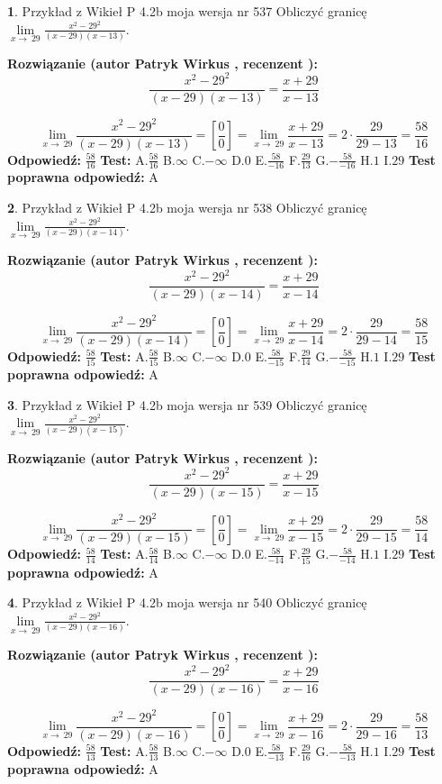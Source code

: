 \documentclass[12pt, a4paper]{article}
\theoremstyle{definition} %
\newtheorem{zad}{}
\newcommand{\zadStart}[1]{\begin{zad}#1\newline}
\newcommand{\zadStop}{\end{zad}}
\newcommand{\rozwStart}[2]{\noindent \textbf{Rozwiązanie (autor #1 , recenzent #2): }\newline}
\newcommand{\rozwStop}{\newline}
\newcommand{\odpStart}{\noindent \textbf{Odpowiedź:}\newline}
\newcommand{\odpStop}{\newline}
\newcommand{\testStart}{\noindent \textbf{Test:}\newline}
\newcommand{\testStop}{\newline}
\newcommand{\kluczStart}{\noindent \textbf{Test poprawna odpowiedź:}\newline}
\newcommand{\kluczStop}{\newline}
\begin{document}
\zadStart{Przykład z Wikieł P 4.2b moja wersja nr 537}
Obliczyć granicę $\lim\limits_{x\to\ 29}\frac{x^{2}-29^{2}}{(x-29)(x-13)}$.
\zadStop
\rozwStart{Patryk Wirkus}{}
$$\frac{x^{2}-29^{2}}{(x-29)(x-13)}=\frac{x+29}{x-13}$$

$$\lim\limits_{x\to\ 29}\frac{x^{2}-29^{2}}{(x-29)(x-13)}=[\frac{0}{0}]=\lim\limits_{x\to\ 29}\frac{x+29}{x-13}=2 \cdot \frac{29}{29-13} = \frac{58}{16}$$
\rozwStop
\odpStart
$\frac{58}{16}$
\odpStop
\testStart
A.$\frac{58}{16}$
B.$\infty$
C.$-\infty$
D.$0$
E.$\frac{58}{-16}$
F.$\frac{29}{13}$
G.$-\frac{58}{-16}$
H.$1$
I.$29$
\testStop
\kluczStart
A
\kluczStop



\zadStart{Przykład z Wikieł P 4.2b moja wersja nr 538}
Obliczyć granicę $\lim\limits_{x\to\ 29}\frac{x^{2}-29^{2}}{(x-29)(x-14)}$.
\zadStop
\rozwStart{Patryk Wirkus}{}
$$\frac{x^{2}-29^{2}}{(x-29)(x-14)}=\frac{x+29}{x-14}$$

$$\lim\limits_{x\to\ 29}\frac{x^{2}-29^{2}}{(x-29)(x-14)}=[\frac{0}{0}]=\lim\limits_{x\to\ 29}\frac{x+29}{x-14}=2 \cdot \frac{29}{29-14} = \frac{58}{15}$$
\rozwStop
\odpStart
$\frac{58}{15}$
\odpStop
\testStart
A.$\frac{58}{15}$
B.$\infty$
C.$-\infty$
D.$0$
E.$\frac{58}{-15}$
F.$\frac{29}{14}$
G.$-\frac{58}{-15}$
H.$1$
I.$29$
\testStop
\kluczStart
A
\kluczStop



\zadStart{Przykład z Wikieł P 4.2b moja wersja nr 539}
Obliczyć granicę $\lim\limits_{x\to\ 29}\frac{x^{2}-29^{2}}{(x-29)(x-15)}$.
\zadStop
\rozwStart{Patryk Wirkus}{}
$$\frac{x^{2}-29^{2}}{(x-29)(x-15)}=\frac{x+29}{x-15}$$

$$\lim\limits_{x\to\ 29}\frac{x^{2}-29^{2}}{(x-29)(x-15)}=[\frac{0}{0}]=\lim\limits_{x\to\ 29}\frac{x+29}{x-15}=2 \cdot \frac{29}{29-15} = \frac{58}{14}$$
\rozwStop
\odpStart
$\frac{58}{14}$
\odpStop
\testStart
A.$\frac{58}{14}$
B.$\infty$
C.$-\infty$
D.$0$
E.$\frac{58}{-14}$
F.$\frac{29}{15}$
G.$-\frac{58}{-14}$
H.$1$
I.$29$
\testStop
\kluczStart
A
\kluczStop



\zadStart{Przykład z Wikieł P 4.2b moja wersja nr 540}
Obliczyć granicę $\lim\limits_{x\to\ 29}\frac{x^{2}-29^{2}}{(x-29)(x-16)}$.
\zadStop
\rozwStart{Patryk Wirkus}{}
$$\frac{x^{2}-29^{2}}{(x-29)(x-16)}=\frac{x+29}{x-16}$$

$$\lim\limits_{x\to\ 29}\frac{x^{2}-29^{2}}{(x-29)(x-16)}=[\frac{0}{0}]=\lim\limits_{x\to\ 29}\frac{x+29}{x-16}=2 \cdot \frac{29}{29-16} = \frac{58}{13}$$
\rozwStop
\odpStart
$\frac{58}{13}$
\odpStop
\testStart
A.$\frac{58}{13}$
B.$\infty$
C.$-\infty$
D.$0$
E.$\frac{58}{-13}$
F.$\frac{29}{16}$
G.$-\frac{58}{-13}$
H.$1$
I.$29$
\testStop
\kluczStart
A
\kluczStop
\end{document}
